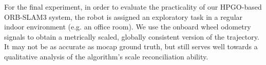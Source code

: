 \documentclass[letterpaper, 10 pt, conference]{ieeeconf}  %
\begin{document}
For the final experiment, in order to evaluate the practicality of our HPGO-based ORB-SLAM3 system, the robot is assigned an exploratory task in a regular indoor environment (e.g. an office room). We use the onboard wheel odometry signals to obtain a metrically scaled, globally consistent version of the trajectory. It may not be as accurate as mocap ground truth, but still serves well towards a qualitative analysis of the algorithm's scale reconciliation ability.
\begin{figure}[h]
    \centering
\end{figure}
\end{document}
